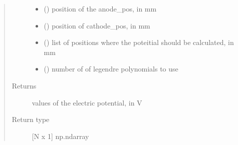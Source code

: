 \documentclass[letterpaper,10pt,english,openany,oneside]{sphinxmanual}
\begin{document}
\begin{fulllineitems}
\begin{quote}
\begin{description}
\begin{itemize}
\item {} 
 (\sphinxstyleliteralemphasis{\sphinxupquote{{[}}}\sphinxstyleliteralemphasis{\sphinxupquote{{]} }}) \textendash{} position of the anode\_pos, in mm

\item {} 
 (\sphinxstyleliteralemphasis{\sphinxupquote{{[}}}\sphinxstyleliteralemphasis{\sphinxupquote{{]} }}) \textendash{} position of cathode\_pos, in mm

\item {} 
 (\sphinxstyleliteralemphasis{\sphinxupquote{{[}}}\sphinxstyleliteralemphasis{\sphinxupquote{{]} }}) \textendash{} list of positions where the poteitial should be calculated, in mm

\item {} 
 (\sphinxstyleliteralemphasis{\sphinxupquote{, }}\sphinxstyleliteralemphasis{\sphinxupquote{, }}) \textendash{} number of of legendre polynomials to use

\end{itemize}

\item[{Returns}] \leavevmode
{} \textendash{} values of the electric potential, in V

\item[{Return type}] \leavevmode
{[}N x 1{]} np.ndarray

\end{description}\end{quote}

\end{fulllineitems}

\end{document}
